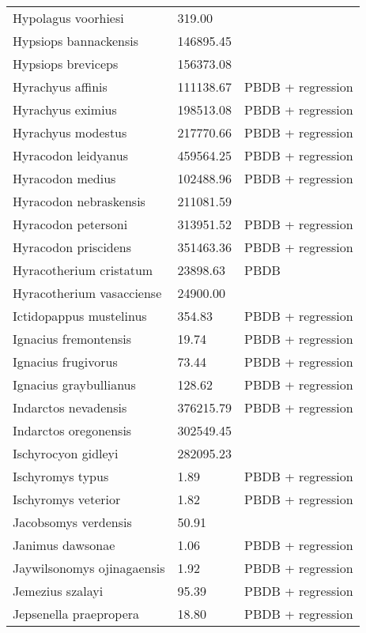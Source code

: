 \documentclass{article}
\begin{document}
\begin{center}
\begin{longtable}{p{} p{} p{}}
    Hypolagus voorhiesi & 319.00 & \cite{McKenna2011} \\ 
    Hypsiops bannackensis & 146895.45 & \cite{Wang1999} \\ 
    Hypsiops breviceps & 156373.08 & \cite{Tomiya2013} \\ 
    Hyrachyus affinis & 111138.67 & PBDB + regression \\ 
    Hyrachyus eximius & 198513.08 & PBDB + regression \\ 
    Hyrachyus modestus & 217770.66 & PBDB + regression \\ 
    Hyracodon leidyanus & 459564.25 & PBDB + regression \\ 
    Hyracodon medius & 102488.96 & PBDB + regression \\ 
    Hyracodon nebraskensis & 211081.59 & \cite{Tomiya2013} \\ 
    Hyracodon petersoni & 313951.52 & PBDB + regression \\ 
    Hyracodon priscidens & 351463.36 & PBDB + regression \\ 
    Hyracotherium cristatum & 23898.63 & PBDB \\ 
    Hyracotherium vasacciense & 24900.00 & \cite{MacFadden1986} \\ 
    Ictidopappus mustelinus & 354.83 & PBDB + regression \\ 
    Ignacius fremontensis & 19.74 & PBDB + regression \\ 
    Ignacius frugivorus & 73.44 & PBDB + regression \\ 
    Ignacius graybullianus & 128.62 & PBDB + regression \\ 
    Indarctos nevadensis & 376215.79 & PBDB + regression \\ 
    Indarctos oregonensis & 302549.45 & \cite{Tomiya2013} \\ 
    Ischyrocyon gidleyi & 282095.23 & \cite{Tomiya2013} \\ 
    Ischyromys typus & 1.89 & PBDB + regression \\ 
    Ischyromys veterior & 1.82 & PBDB + regression \\ 
    Jacobsomys verdensis & 50.91 & \cite{Tomiya2013} \\ 
    Janimus dawsonae & 1.06 & PBDB + regression \\ 
    Jaywilsonomys ojinagaensis & 1.92 & PBDB + regression \\ 
    Jemezius szalayi & 95.39 & PBDB + regression \\ 
    Jepsenella praepropera & 18.80 & PBDB + regression \\ 

\end{longtable}
\end{center}
\end{document}

